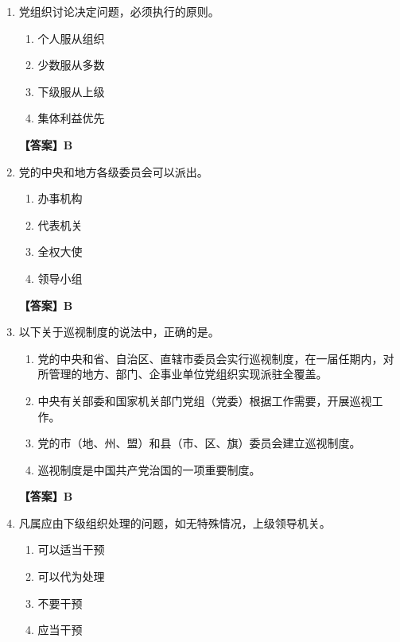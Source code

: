 \documentclass[UTF8,11pt,a4paper]{ctexart}
\begin{document}
\begin{enumerate}[label=\textbf{\arabic*.}, leftmargin=2.5em, itemsep=0.7em]
\begin{enumerate}[label=\Alph*., leftmargin=2em, itemsep=0.1em, topsep=0.15em]
\end{enumerate}
\textbf{【答案】B}
\item 党组织讨论决定问题，必须执行\allowbreak\underline{\hspace{4em}}的原则。
\begin{enumerate}[label=\Alph*., leftmargin=2em, itemsep=0.1em, topsep=0.15em]
\item 个人服从组织
\item 少数服从多数
\item 下级服从上级
\item 集体利益优先
\end{enumerate}
\textbf{【答案】B}
\item 党的中央和地方各级委员会可以派出\allowbreak\underline{\hspace{4em}}。
\begin{enumerate}[label=\Alph*., leftmargin=2em, itemsep=0.1em, topsep=0.15em]
\item 办事机构
\item 代表机关
\item 全权大使
\item 领导小组
\end{enumerate}
\textbf{【答案】B}
\item 以下关于巡视制度的说法中，正确的是\allowbreak\underline{\hspace{4em}}。
\begin{enumerate}[label=\Alph*., leftmargin=2em, itemsep=0.1em, topsep=0.15em]
\item 党的中央和省、自治区、直辖市委员会实行巡视制度，在一届任期内，对所管理的地方、部门、企事业单位党组织实现派驻全覆盖。
\item 中央有关部委和国家机关部门党组（党委）根据工作需要，开展巡视工作。
\item 党的市（地、州、盟）和县（市、区、旗）委员会建立巡视制度。
\item 巡视制度是中国共产党治国的一项重要制度。
\end{enumerate}
\textbf{【答案】B}
\item 凡属应由下级组织处理的问题，如无特殊情况，上级领导机关\allowbreak\underline{\hspace{4em}}。
\begin{enumerate}[label=\Alph*., leftmargin=2em, itemsep=0.1em, topsep=0.15em]
\item 可以适当干预
\item 可以代为处理
\item 不要干预
\item 应当干预
\end{enumerate}

\end{enumerate}
\end{document}

